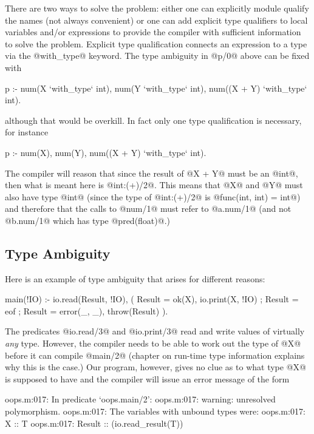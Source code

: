 There are two ways to solve the problem: either one can explicitly module
qualify the names (not always convenient) or one can add explicit type
qualifiers to local variables and/or expressions to provide the compiler
with sufficient information to solve the problem.  Explicit type
qualification connects an expression to a type via the @with_type@ keyword.
The type ambiguity in @p/0@ above can be fixed with
\begin{myverbatim}
p :-
    num(X `with_type` int),
    num(Y `with_type` int),
    num((X + Y) `with_type` int).
\end{myverbatim}
although that would be overkill.  In fact only one type qualification is
necessary, for instance
\begin{myverbatim}
p :-
    num(X),
    num(Y),
    num((X + Y) `with_type` int).
\end{myverbatim}
The compiler will reason that since the result of @X + Y@ must be an
@int@, then what is meant here is @int:(+)/2@.  This means that @X@ and @Y@
must also have type @int@ (since the type of @int:(+)/2@ is
@func(int, int) = int@) and therefore that the calls to @num/1@ must refer
to @a.num/1@ (and not @b.num/1@ which has type @pred(float)@.)

\subsection{Type Ambiguity}

Here is an example of type ambiguity that arises for different reasons:
\begin{myverbatim}
main(!IO) :-
    io.read(Result, !IO),
    (
        Result = ok(X),
        io.print(X, !IO)
    ;
        Result = eof
    ;
        Result = error(_, _),
        throw(Result)
    ).
\end{myverbatim}
The predicates @io.read/3@ and @io.print/3@ read and write values of
virtually \emph{any} type.  However, the compiler needs to be able to work
out the type of @X@ before it can compile @main/2@ (chapter \XXX{} on
run-time type information explains why this is the case.)  Our program,
however, gives no clue as to what type @X@ is supposed to have and the
compiler will issue an error message of the form
\begin{myverbatim}
oops.m:017: In predicate `oops.main/2':
oops.m:017:   warning: unresolved polymorphism.
oops.m:017:   The variables with unbound types were:
oops.m:017:       X :: T
oops.m:017:       Result :: (io.read_result(T))
\end{myverbatim}


